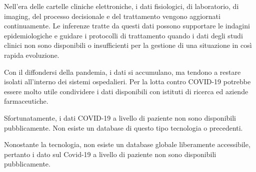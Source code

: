 \noindent Nell'era delle cartelle cliniche elettroniche, i dati fisiologici, di laboratorio, di imaging, del processo decisionale e del trattamento vengono aggiornati continuamente. Le inferenze tratte da questi dati possono supportare le indagini epidemiologiche e guidare i protocolli di trattamento quando i dati degli studi clinici non sono disponibili o insufficienti per la gestione di una situazione in così rapida evoluzione.

\noindent Con il diffondersi della pandemia, i dati si accumulano, ma tendono a restare isolati all'interno dei sistemi ospedalieri. Per la lotta contro COVID-19 potrebbe essere molto utile condividere i dati disponibili con istituti di ricerca ed aziende farmaceutiche.

\noindent Sfortunatamente, i dati COVID-19 a livello di paziente non sono disponibili pubblicamente. 
Non esiste un database di questo tipo tecnologia o precedenti. 

\noindent Nonostante la tecnologia, non esiste un database globale liberamente accessibile, pertanto i dato sul Covid-19 a livello di paziente non sono disponibili pubblicamente.




